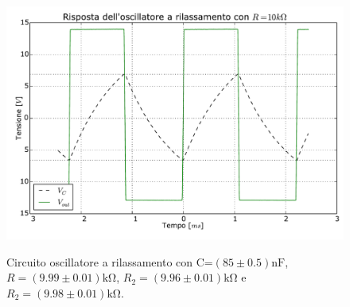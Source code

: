 \begin{figure}[ht]
 \centering
   {\includegraphics[width=14.5cm]{../E04/latex/osc10k.pdf}}
 \caption{Circuito oscillatore a rilassamento con C=$(85\pm0.5) \si{\nano\farad}$, $R=(9.99\pm0.01)\si{\kilo\ohm}$, $R_2=(9.96\pm0.01)\si{\kilo\ohm}$ e $R_2=(9.98\pm0.01)\si{\kilo\ohm}$.}
 \label{gr4:osc10k}
\end{figure}